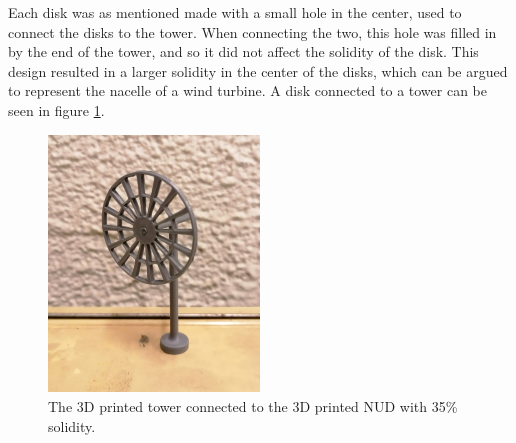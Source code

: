Each disk was as mentioned made with a small hole in the center, used to connect the disks to the tower. When connecting the two, this hole was filled in by the end of the tower, and so it did not affect the solidity of the disk. This design resulted in a larger solidity in the center of the disks, which can be argued to represent the nacelle of a wind turbine. A disk connected to a tower can be seen in figure \ref{Fig:towerAndAD}. 



\begin{figure}
    \centering
    \includegraphics[width=0.5\textwidth]{0_Images/baseAndAD.jpg}    
    \caption{The 3D printed tower connected to the 3D printed NUD with 35\% solidity.}
    \label{Fig:towerAndAD}
\end{figure}



